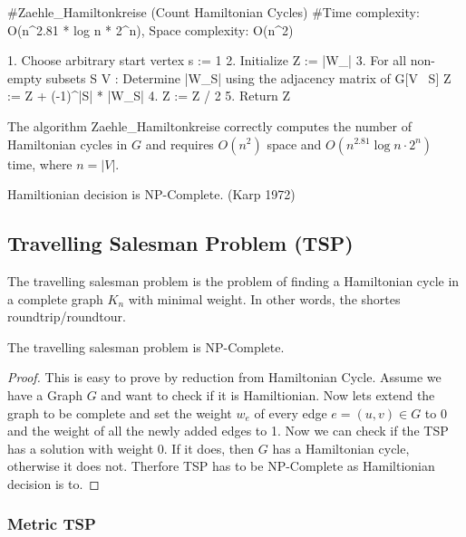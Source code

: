 \begin{algorithm}
	#Zaehle_Hamiltonkreise (Count Hamiltonian Cycles)
	#Time complexity: O(n^2.81 * log n * 2^n), Space complexity: O(n^2)

	1. Choose arbitrary start vertex s := 1
	2. Initialize Z := |W_\emptyset|
	3. For all non-empty subsets S \subseteq V :
	Determine |W_S| using the adjacency matrix of G[V \ S]
	Z := Z + (-1)^|S| * |W_S|
	4. Z := Z / 2
	5. Return Z
\end{algorithm}

\begin{theorem}
	The algorithm Zaehle\_Hamiltonkreise correctly computes the number of Hamiltonian cycles in $G$ and requires $O(n^2)$ space and $O(n^{2.81} \log n \cdot 2^n)$ time, where $n = |V|$.
\end{theorem}

\begin{theorem}
	Hamiltionian decision is NP-Complete. (Karp 1972)
\end{theorem}

\subsection{Travelling Salesman Problem (TSP)}

The travelling salesman problem is the problem of finding a Hamiltonian cycle in a complete graph $K_n$ with
minimal weight. In other words, the shortes roundtrip/roundtour.

\begin{theorem}
	The travelling salesman problem is NP-Complete.
\end{theorem}

\begin{proof}
	This is easy to prove by reduction from Hamiltonian Cycle. Assume we have a
	Graph $G$ and want to check if it is Hamiltionian. Now lets extend the graph to be complete and set the
	weight $w_e$ of every edge $e = (u,v) \in G$ to 0 and the weight of all the newly added edges to 1. Now we
	can check if the TSP has a solution with weight 0. If it does, then $G$ has a Hamiltonian cycle, otherwise
	it does not. Therfore TSP has to be NP-Complete as Hamiltionian decision is to.
\end{proof}

\subsubsection{Metric TSP}

